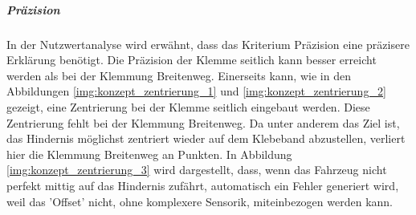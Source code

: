 \documentclass[../main.tex]{subfiles}
\begin{document}
        \newpage
            
            \subparagraph{Präzision}\label{a3:Präzision}

            In der Nutzwertanalyse wird erwähnt, dass das Kriterium Präzision eine präzisere Erklärung benötigt. Die Präzision der Klemme seitlich kann besser erreicht werden als bei der Klemmung Breitenweg. Einerseits kann, wie in den Abbildungen \ref{img:konzept_zentrierung_1} und \ref{img:konzept_zentrierung_2} gezeigt, eine Zentrierung bei der Klemme seitlich eingebaut werden. Diese Zentrierung fehlt bei der Klemmung Breitenweg. Da unter anderem das Ziel ist, das Hindernis möglichst zentriert wieder auf dem Klebeband abzustellen, verliert hier die Klemmung Breitenweg an Punkten. In Abbildung \ref{img:konzept_zentrierung_3} wird dargestellt, dass, wenn das Fahrzeug nicht perfekt mittig auf das Hindernis zufährt, automatisch ein Fehler generiert wird, weil das 'Offset' nicht, ohne komplexere Sensorik, miteinbezogen werden kann.
\end{document}
